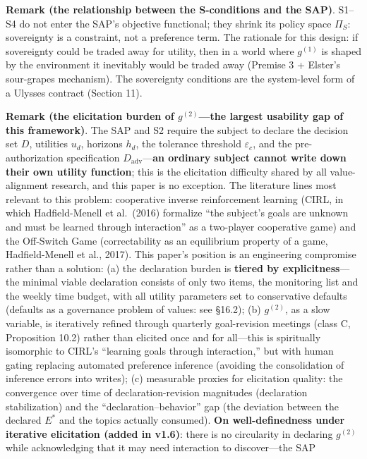 \documentclass[
  11pt]{article}
\begin{document}
\textbf{Remark (the relationship between the S-conditions and the SAP)}.
S1--S4 do not enter the SAP's objective functional; they shrink its
policy space \(\Pi_S\): sovereignty is a constraint, not a preference
term. The rationale for this design: if sovereignty could be traded away
for utility, then in a world where \(g^{(1)}\) is shaped by the
environment it inevitably would be traded away (Premise 3 + Elster's
sour-grapes mechanism). The sovereignty conditions are the system-level
form of a Ulysses contract (Section 11).

\textbf{Remark (the elicitation burden of \(g^{(2)}\)---the largest
usability gap of this framework)}. The SAP and S2 require the subject to
declare the decision set \(D\), utilities \(u_d\), horizons \(h_d\), the
tolerance threshold \(\varepsilon_c\), and the pre-authorization
specification \(D_{\mathrm{adv}}\)---\textbf{an ordinary subject cannot
write down their own utility function}; this is the elicitation
difficulty shared by all value-alignment research, and this paper is no
exception. The literature lines most relevant to this problem:
cooperative inverse reinforcement learning (CIRL, in which
Hadfield-Menell et al.~(2016) formalize ``the subject's goals are
unknown and must be learned through interaction'' as a two-player
cooperative game) and the Off-Switch Game (correctability as an
equilibrium property of a game, Hadfield-Menell et al., 2017). This
paper's position is an engineering compromise rather than a solution:
(a) the declaration burden is \textbf{tiered by explicitness}---the
minimal viable declaration consists of only two items, the monitoring
list and the weekly time budget, with all utility parameters set to
conservative defaults (defaults as a governance problem of values: see
§16.2); (b) \(g^{(2)}\), as a slow variable, is iteratively refined
through quarterly goal-revision meetings (class C, Proposition 10.2)
rather than elicited once and for all---this is spiritually isomorphic
to CIRL's ``learning goals through interaction,'' but with human gating
replacing automated preference inference (avoiding the consolidation of
inference errors into writes); (c) measurable proxies for elicitation
quality: the convergence over time of declaration-revision magnitudes
(declaration stabilization) and the ``declaration--behavior'' gap (the
deviation between the declared \(E^*\) and the topics actually
consumed). \textbf{On well-definedness under iterative elicitation
(added in v1.6)}: there is no circularity in declaring \(g^{(2)}\) while
acknowledging that it may need interaction to discover---the SAP
\end{document}

